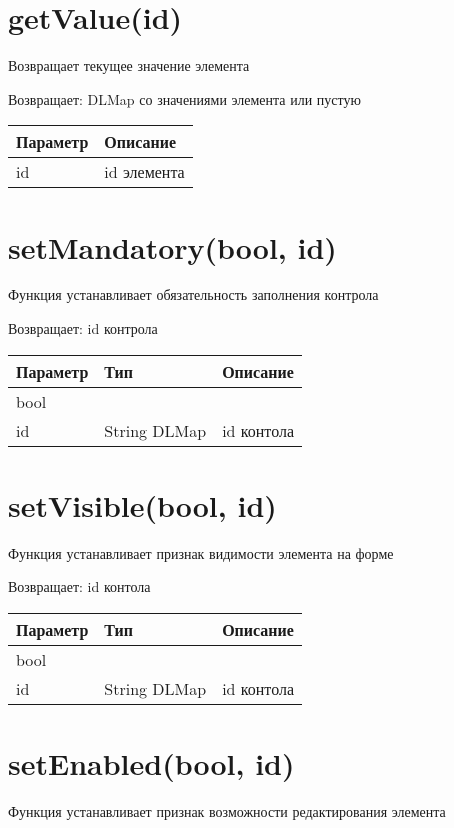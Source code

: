 \hypertarget{getvalueid}{%
\section{getValue(id)}\label{getvalueid}}

Возвращает текущее значение элемента

Возвращает: DLMap со значениями элемента или пустую

\begin{longtable}[]{@{}ll@{}}
\toprule
Параметр & Описание\tabularnewline
\midrule
\endhead
id & id элемента\tabularnewline
\bottomrule
\end{longtable}

\hypertarget{setmandatorybool-id}{%
\section{setMandatory(bool, id)}\label{setmandatorybool-id}}

Функция устанавливает обязательность заполнения контрола

Возвращает: id контрола

\begin{longtable}[]{@{}lll@{}}
\toprule
Параметр & Тип & Описание\tabularnewline
\midrule
\endhead
bool & &\tabularnewline
id & String \textbar{} DLMap & id контола\tabularnewline
\bottomrule
\end{longtable}

\hypertarget{setvisiblebool-id}{%
\section{setVisible(bool, id)}\label{setvisiblebool-id}}

Функция устанавливает признак видимости элемента на форме

Возвращает: id контола

\begin{longtable}[]{@{}lll@{}}
\toprule
Параметр & Тип & Описание\tabularnewline
\midrule
\endhead
bool & &\tabularnewline
id & String \textbar{} DLMap & id контола\tabularnewline
\bottomrule
\end{longtable}

\hypertarget{setenabledbool-id}{%
\section{setEnabled(bool, id)}\label{setenabledbool-id}}

Функция устанавливает признак возможности редактирования элемента

